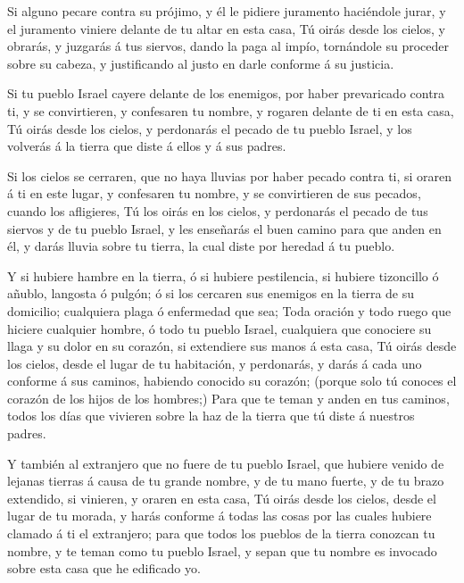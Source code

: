  Si alguno pecare contra su prójimo, y él le pidiere
juramento haciéndole jurar, y el juramento viniere delante de tu altar
en esta casa,  Tú oirás desde los cielos, y obrarás, y
juzgarás á tus siervos, dando la paga al impío, tornándole su proceder
sobre su cabeza, y justificando al justo en darle conforme á su
justicia.

 Si tu pueblo Israel cayere delante de los enemigos, por
haber prevaricado contra ti, y se convirtieren, y confesaren tu nombre,
y rogaren delante de ti en esta casa,  Tú oirás desde los
cielos, y perdonarás el pecado de tu pueblo Israel, y los volverás á la
tierra que diste á ellos y á sus padres.

 Si los cielos se cerraren, que no haya lluvias por haber
pecado contra ti, si oraren á ti en este lugar, y confesaren tu nombre,
y se convirtieren de sus pecados, cuando los afligieres, 
Tú los oirás en los cielos, y perdonarás el pecado de tus siervos y de
tu pueblo Israel, y les enseñarás el buen camino para que anden en él, y
darás lluvia sobre tu tierra, la cual diste por heredad á tu pueblo.

 Y si hubiere hambre en la tierra, ó si hubiere
pestilencia, si hubiere tizoncillo ó añublo, langosta ó pulgón; ó si los
cercaren sus enemigos en la tierra de su domicilio; cualquiera plaga ó
enfermedad que sea;  Toda oración y todo ruego que
hiciere cualquier hombre, ó todo tu pueblo Israel, cualquiera que
conociere su llaga y su dolor en su corazón, si extendiere sus manos á
esta casa,  Tú oirás desde los cielos, desde el lugar de
tu habitación, y perdonarás, y darás á cada uno conforme á sus caminos,
habiendo conocido su corazón; (porque solo tú conoces el corazón de los
hijos de los hombres;)  Para que te teman y anden en tus
caminos, todos los días que vivieren sobre la haz de la tierra que tú
diste á nuestros padres.

 Y también al extranjero que no fuere de tu pueblo
Israel, que hubiere venido de lejanas tierras á causa de tu grande
nombre, y de tu mano fuerte, y de tu brazo extendido, si vinieren, y
oraren en esta casa,  Tú oirás desde los cielos, desde el
lugar de tu morada, y harás conforme á todas las cosas por las cuales
hubiere clamado á ti el extranjero; para que todos los pueblos de la
tierra conozcan tu nombre, y te teman como tu pueblo Israel, y sepan que
tu nombre es invocado sobre esta casa que he edificado yo.

